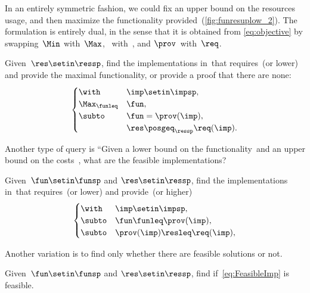 In an entirely symmetric fashion, we could fix an upper bound on the resources usage, and then maximize the functionality provided~(\cref{fig:funresuplow_2}).
The formulation is entirely dual, in the sense that it is obtained from \cref{eq:objective} by swapping~$\Min$ with~$\Max$, \funsp~with~\ressp,
and $\prov$~with~$\req$.

\begin{problem}[\FixResMaxFun]
\label{prob:FixResMaxFun}
Given~$\res\setin\ressp$, find the implementations in~\impsp that requires~\res (or lower) and provide the maximal functionality, or provide a proof that there are none:
\begin{equation}
    \begin{cases}
        \with          & \imp\setin\impsp,               \\
        \Max_{\funleq} & \fun,                           \\
        \subto         & \fun=\prov(\imp),               \\
                       & \res\posgeq_{\ressp}\req(\imp).
    \end{cases}\label{eq:objective-1}
\end{equation}
\end{problem}


\begin{figure*}
    \centering
    \caption{}
    \label{fig:funresuplow_2}
\end{figure*}

Another type of query is
``Given a lower bound on the functionality~\fun and an upper bound on the costs~\fun, what are the feasible implementations?

\begin{problem}[\FeasibleImp]
\label{prob:FeasibleImp}
Given~$\fun\setin\funsp$ and $\res\setin\ressp$, find the implementations in~\impsp that requires~\res (or lower) and provide~\fun (or higher)
\begin{equation}
    \label{eq:FeasibleImp}
    \begin{cases}
        \with  & \imp\setin\impsp,                \\
        \subto & \fun \funleq \prov(\imp),        \\
        \subto & \prov(\imp) \resleq \req(\imp) , \\
    \end{cases}
\end{equation}
\end{problem}

Another variation is to find only whether there are feasible solutions or not.

\begin{problem}[\Feasibility]
\label{prob:Feasibility}
Given~$\fun\setin\funsp$ and $\res\setin\ressp$, find if~\cref{eq:FeasibleImp} is feasible.
\end{problem}
